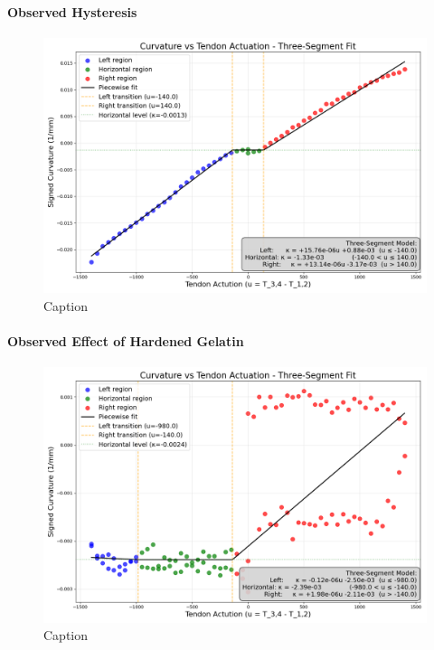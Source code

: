 \paragraph*{Observed Hysteresis}
\begin{figure} [H]
    \centering
    \includegraphics[width=0.9\linewidth]{images/ribbonadapter/Ribbonfit_2025-06-17_17-34-03.png}
    \caption{Caption}
    \label{fig:enter-label}
\end{figure}

\paragraph*{Observed Effect of Hardened Gelatin}
\begin{figure} [H]
    \centering
    \includegraphics[width=0.9\linewidth]{images/ribbonadapter/ribbonfit_2025-06-27_17-45-46.png}
    \caption{Caption}
    \label{fig:enter-label}
\end{figure}


